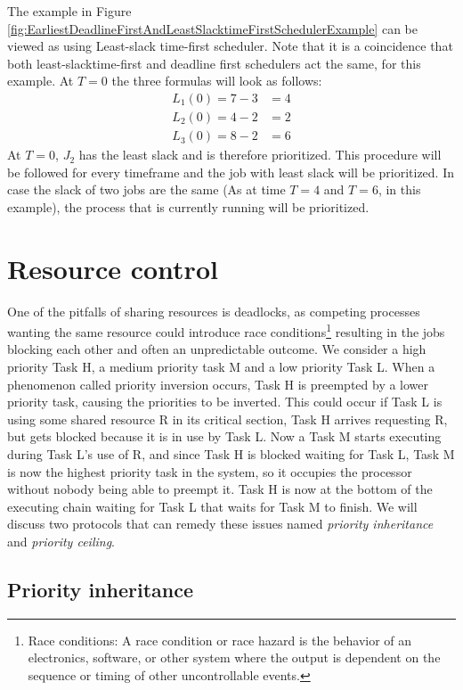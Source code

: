 The example in Figure \ref{fig:EarliestDeadlineFirstAndLeastSlacktimeFirstSchedulerExample} can be viewed as using Least-slack time-first scheduler. Note that it is a coincidence that both least-slacktime-first and deadline first schedulers act the same, for this example. At $T=0$ the three formulas will look as follows:
\begin{align}
	L_1(0)=7-3&=4 \\
	L_2(0)=4-2&=2 \\
	L_3(0)=8-2&=6
\end{align}
At $T=0$, $J_2$ has the least slack and is therefore prioritized. This procedure will be followed for every timeframe and the job with least slack will be prioritized. In case the slack of two jobs are the same (As at time $T=4$ and $T=6$, in this example), the process that is currently running will be prioritized.

\section{Resource control}

One of the pitfalls of sharing resources is deadlocks, as competing processes wanting the same resource could introduce race conditions\footnote{Race conditions: A race condition or race hazard is the behavior of an electronics, software, or other system where the output is dependent on the sequence or timing of other uncontrollable events.} resulting in the jobs blocking each other and often an unpredictable outcome. We consider a high priority Task H, a medium priority task M and a low priority Task L. When a phenomenon called priority inversion occurs, Task H is preempted by a lower priority task, causing the priorities to be inverted. This could occur if Task L is using some shared resource R in its critical section, Task H arrives requesting R, but gets blocked because it is in use by Task L. Now a Task M starts executing during Task L's use of R, and since Task H is blocked waiting for Task L, Task M is now the highest priority task in the system, so it occupies the processor without nobody being able to preempt it. Task H is now at the bottom of the executing chain waiting for Task L that waits for Task M to finish. We will discuss two protocols that can remedy these issues named \textit{priority inheritance} and \textit{priority ceiling}.

\subsection{Priority inheritance}

